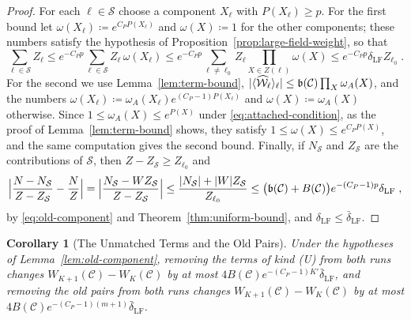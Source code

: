 \documentclass[11pt]{preprint}
\DeclarePairedDelimiter{\abs}{\lvert}{\rvert}
\numberwithin{equation}{section}
\newtheorem{corollary}[theorem]{Corollary}
\theoremstyle{definition}
\theoremstyle{remark}
\theoremstyle{plain}
\begin{document}
\begin{proof}
For each $\ell \in \mathcal S$ choose a component $X_\ell$ with $P(X_\ell) \geq p$. For the first bound let $\omega(X_\ell) \coloneqq e^{C_PP(X_\ell)}$ and $\omega(X) \coloneqq 1$ for the other components; these numbers satisfy the hypothesis of Proposition~\ref{prop:large-field-weight}, so that
\begin{equation}\label{eq:old-component-proof}
    \sum_{\ell \in \mathcal S}Z_\ell \leq e^{-C_Pp}\sum_{\ell \in \mathcal S}Z_\ell\,\omega(X_\ell) \leq e^{-C_Pp}\sum_{\ell \neq \ell_0}Z_\ell\prod_{X \in Z(\ell)}\omega(X) \leq e^{-C_Pp}\delta_{\mathrm{LF}}Z_{\ell_0}\;.
\end{equation}
For the second we use Lemma~\ref{lem:term-bound}, $\abs{\langle\widehat{\mathcal W}_\ell\rangle_\ell} \leq \mathfrak b(\mathcal C)\prod_X\omega_A(X)$, and the numbers $\omega(X_\ell) \coloneqq \omega_A(X_\ell)e^{(C_P-1)P(X_\ell)}$ and $\omega(X) \coloneqq \omega_A(X)$ otherwise. Since $1 \leq \omega_A(X) \leq e^{P(X)}$ under \eqref{eq:attached-condition}, as the proof of Lemma~\ref{lem:term-bound} shows, they satisfy $1 \leq \omega(X) \leq e^{C_PP(X)}$, and the same computation gives the second bound. Finally, if $N_{\mathcal S}$ and $Z_{\mathcal S}$ are the contributions of $\mathcal S$, then $Z - Z_{\mathcal S} \geq Z_{\ell_0}$ and
\begin{equation}\label{eq:removal}
    \Bigl\lvert\frac{N - N_{\mathcal S}}{Z - Z_{\mathcal S}} - \frac{N}{Z}\Bigr\rvert = \Bigl\lvert\frac{N_{\mathcal S} - WZ_{\mathcal S}}{Z - Z_{\mathcal S}}\Bigr\rvert \leq \frac{\abs{N_{\mathcal S}} + \abs{W}Z_{\mathcal S}}{Z_{\ell_0}} \leq \bigl(\mathfrak b(\mathcal C) + B(\mathcal C)\bigr)e^{-(C_P-1)p}\delta_{\mathrm{LF}}\;,
\end{equation}
by \eqref{eq:old-component} and Theorem~\ref{thm:uniform-bound}, and $\delta_{\mathrm{LF}} \leq \bar\delta_{\mathrm{LF}}$.
\end{proof}

\begin{corollary}[The Unmatched Terms and the Old Pairs]\label{cor:unmatched-old}
Under the hypotheses of Lemma~\ref{lem:old-component}, removing the terms of kind (U) from both runs changes $W_{K+1}(\mathcal C) - W_K(\mathcal C)$ by at most $4B(\mathcal C)e^{-(C_P-1)K'}\bar\delta_{\mathrm{LF}}$, and removing the old pairs from both runs changes $W_{K+1}(\mathcal C) - W_K(\mathcal C)$ by at most $4B(\mathcal C)e^{-(C_P-1)(m+1)}\bar\delta_{\mathrm{LF}}$.
\end{corollary}
\end{document}
